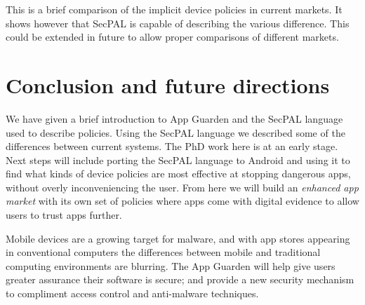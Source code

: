 \documentclass[]{llncs}
\newcommand{\keyword}[1]{\textsf{#1}}
\newcommand{\entity}[1]{\textrm{#1}}
\newcommand{\says}{\keyword{~says~}}
\newcommand{\meets}{\keyword{~meets~}}
\newcommand{\shows}{\keyword{~shows~}}
\newcommand{\installable}{\keyword{~is installable}}
\newcommand{\Phone}{\entity{Phone}}
\newcommand{\Nll}{\entity{NoInfoLeaks}}
\newcommand{\Nlli}{\entity{NILInferer}}
\newcommand{\Nm}{\entity{NotMalware}}
\newcommand{\Google}{\entity{Google}}
\newcommand{\App}{\entity{Game}}
\newcommand{\Evi}{\entity{Evidence}}
\newcommand{\LocalChecks}[2]{\textsf{Local#2Check}{\left(#1\right)}}
\newcommand{\rrule}[1]{\textsc{\small #1}}
\newcommand{\rcansay}{\rrule{can say}}
\newcommand{\rcond}[1]{\rrule{cond #1}}
\newcommand{\eref}[1]{(\ref{#1})}
\begin{document}
This is a brief comparison of the implicit device policies in current markets.
It shows however that SecPAL is capable of describing the various difference.
This could be extended in future to allow proper comparisons of different
markets.

\section{Conclusion and future directions}

We have given a brief introduction to App Guarden and the SecPAL language used
to describe policies.
Using the SecPAL language we described some of the differences between current
systems. The PhD work here is at an early stage. Next steps will include
porting the SecPAL language to Android and using it to find what kinds of
device policies are most effective at stopping dangerous apps, without overly
inconveniencing the user. From here we will build an \emph{enhanced app market}
with its own set of policies where apps come with
digital evidence to allow users to trust apps further.

Mobile devices are a growing target for malware, and with app stores appearing
in conventional computers the differences between mobile and traditional
computing environments are blurring.  The App Guarden will help give users
greater assurance their software is secure; and provide a new security
mechanism to compliment access control and anti-malware techniques.



\appendix

%




\end{document}
